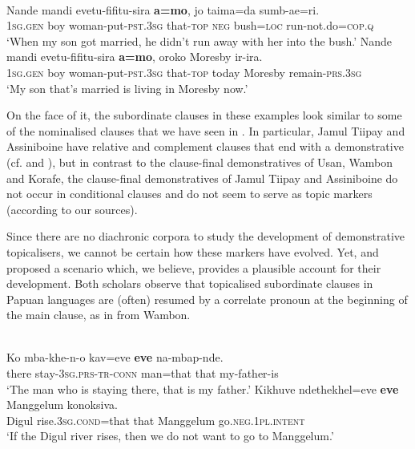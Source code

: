 \documentclass[output=paper,colorlinks,citecolor=brown]{langscibook}
\begin{document}
\ea\label{ex:diessel:48}
\\
\ea \gll   {\ob}Nande   mandi   evetu-fifitu-sira   \textbf{a=mo}{\cb},  jo   taima=da  sumb-ae=ri.\\
       {\db}\textsc{1sg.gen}   boy   woman-put-\textsc{pst.3sg}   that-\textsc{top}  \textsc{neg}   bush=\textsc{loc}  run-not.do=\textsc{cop.q}\\
\glt   ‘When my son got married, he didn’t run away with her into the bush.’
\ex
\gll   {\ob}Nande   mandi   evetu-fifitu-sira   \textbf{a=mo}{\cb},   oroko  Moresby  ir-ira.\\
       {\db}\textsc{1sg.gen}   boy   woman-put-\textsc{pst.3sg} that-\textsc{top}  today  Moresby remain-\textsc{prs.3sg}\\
\glt ‘My son that’s married is living in Moresby now.’
\z
\z

On the face of it, the subordinate clauses in these examples look similar to some of the nominalised clauses that we have seen in . In particular, Jamul Tiipay and Assiniboine have relative and complement clauses that end with a demonstrative (cf.  and ), but in contrast to the clause-final demonstratives of Usan, Wambon and Korafe, the clause-final demonstratives of Jamul Tiipay and Assiniboine do not occur in conditional clauses and do not seem to serve as topic markers (according to our sources).

Since there are no diachronic corpora to study the development of demonstrative topicalisers, we cannot be certain how these markers have evolved. Yet, \citet{Reesink1984} and \citet{Vries1995} proposed a scenario which, we believe, provides a plausible account for their development. Both scholars observe that topicalised subordinate clauses in Papuan languages are (often) resumed by a correlate pronoun at the beginning of the main clause, as in  from Wambon.

\ea\label{ex:diessel:49}
\\
\ea \gll   {\ob}Ko  mba-khe-n-o    kav=eve{\cb}  \textbf{eve}   na-mbap-nde.\\
       {\db}there  stay-\textsc{3sg.prs-tr-conn}  man=that  that   my-father-is\\
\glt ‘The man who is staying there, that is my father.’
\ex
\gll   {\ob}Kikhuve   ndethekhel=eve{\cb}     \textbf{eve}  Manggelum  konoksiva.    \\
       {\db}Digul     rise.3\textsc{sg.cond}=that   that  Manggelum   go\textsc{.neg.1pl.intent}\\
\glt ‘If the Digul river rises, then we do not want to go to Manggelum.’
\z
\z
\end{document}
